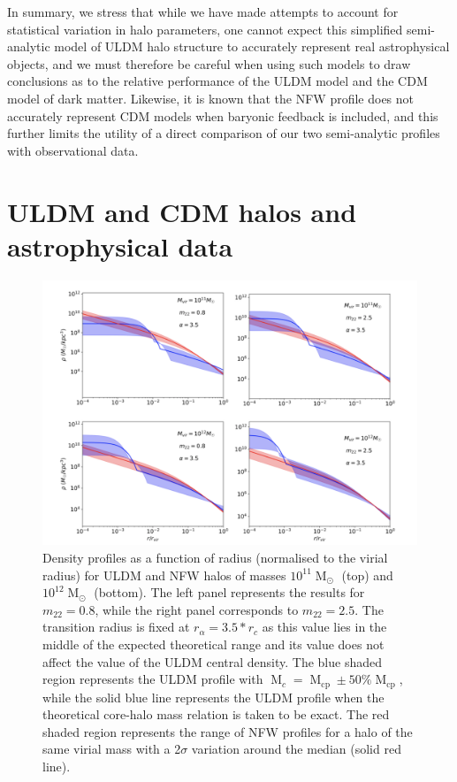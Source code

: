 \documentclass{pasa}%
\begin{document}
In summary, we stress that while we have made attempts to account for statistical variation in halo parameters, one cannot expect this simplified semi-analytic model of ULDM halo structure to accurately represent real astrophysical objects, and we must therefore be careful when using such models to draw conclusions as to the relative performance of the ULDM model and the CDM model of dark matter. Likewise, it is known that the NFW profile does not accurately represent CDM models when baryonic feedback is included, and this further limits the utility of a direct comparison of our two semi-analytic profiles with observational data. 


\section{ULDM and CDM halos and astrophysical data}\label{sec:velocity}

\begin{figure}[t]
\centering
\includegraphics[scale=0.4, trim={2cm 0cm 0cm 1cm}]{new_combined_1.png}
\caption{Density profiles as a function of radius (normalised to the virial radius) for ULDM and NFW halos of masses $10^{11}\operatorname{M}_{\odot}$ (top) and $10^{12}\operatorname{M}_{\odot}$ (bottom). The left panel represents the results for $m_{22} = 0.8$, while the right panel corresponds to $m_{22}=2.5$. The transition radius is fixed at $r_{\alpha} = 3.5*r_c$ as this value lies in the middle of the expected theoretical range and its value does not affect the value of the ULDM central density. The blue shaded region represents the ULDM profile with $\operatorname{M}_c = \operatorname{M}_{\mathrm{cp}} \pm 50 \% \operatorname{M}_{\mathrm{cp}}$, while the solid blue line represents the ULDM profile when the theoretical core-halo mass relation is taken to be exact. The red shaded region represents the range of NFW profiles for a halo of the same virial mass with a 2$\sigma$ variation around the median (solid red line).}\label{fig:profiles}
\end{figure}
 
\end{document}
